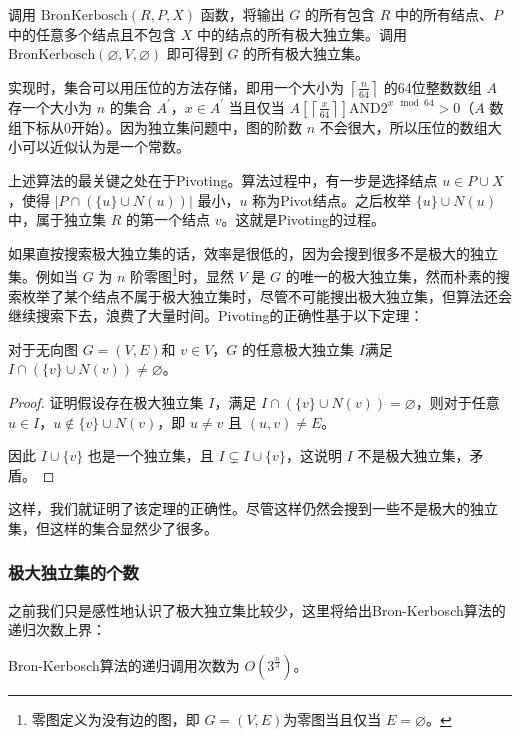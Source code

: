 \documentclass[lang=cn,11pt,a4paper]{elegantpaper}
\begin{document}
调用 $\mathrm{BronKerbosch}(R, P, X)$ 函数，将输出 $G$ 的所有包含 $R$ 中的所有结点、$P$ 中的任意多个结点且不包含 $X$ 中的结点的所有极大独立集。调用 $\mathrm{BronKerbosch}(\varnothing, V, \varnothing)$ 即可得到 $G$ 的所有极大独立集。

实现时，集合可以用压位的方法存储，即用一个大小为 $\left \lceil \frac{n}{64} \right \rceil $ 的64位整数数组 $A$ 存一个大小为 $n$ 的集合 $A^{'}$，$x \in A^{'}$ 当且仅当 $A[\left \lceil \frac{x}{64} \right \rceil ] \text{AND} 2^{x \mod 64} > 0$（$A$ 数组下标从0开始）。因为独立集问题中，图的阶数 $n$ 不会很大，所以压位的数组大小可以近似认为是一个常数。

上述算法的最关键之处在于Pivoting。算法过程中，有一步是选择结点 $u \in P \cup X$，使得 $|P \cap \left(\{u\} \cup N(u)\right)|$ 最小，$u$ 称为Pivot结点。之后枚举 $\{u\}\cup N(u)$ 中，属于独立集 $R$ 的第一个结点 $v$。这就是Pivoting的过程。

如果直按搜索极大独立集的话，效率是很低的，因为会搜到很多不是极大的独立集。例如当 $G$ 为 $n$ 阶零图\footnote{零图定义为没有边的图，即 $G = (V, E)$为零图当且仅当 $E = \varnothing$。}时，显然 $V$ 是 $G$ 的唯一的极大独立集，然而朴素的搜索枚举了某个结点不属于极大独立集时，尽管不可能搜出极大独立集，但算法还会继续搜索下去，浪费了大量时间。Pivoting的正确性基于以下定理：
\begin{theorem}
    对于无向图 $G=(V, E)$和 $v \in V$，$G$ 的任意极大独立集 $I$满足 $I \cap(\{v\} \cup N(v)) \neq \varnothing$。
\end{theorem}
\begin{proof}
    证明假设存在极大独立集 $I$，满足 $I \cap(\{v\} \cup N(v)) = \varnothing$，则对于任意 $u \in I$，$u \notin \{v\} \cup N(v)$，即 $u \neq v$ 且 $(u, v) \neq E$。

    因此 $I \cup \{v\}$ 也是一个独立集，且 $I \subsetneq I \cup \{v\}$，这说明 $I$ 不是极大独立集，矛盾。
\end{proof}

这样，我们就证明了该定理的正确性。尽管这样仍然会搜到一些不是极大的独立集，但这样的集合显然少了很多。

\subsubsection{极大独立集的个数}
之前我们只是感性地认识了极大独立集比较少，这里将给出Bron-Kerbosch算法的递归次数上界：
\begin{theorem}
    Bron-Kerbosch算法的递归调用次数为 $O(3^{\frac{n}{3}})$。
\end{theorem}
\end{document}
